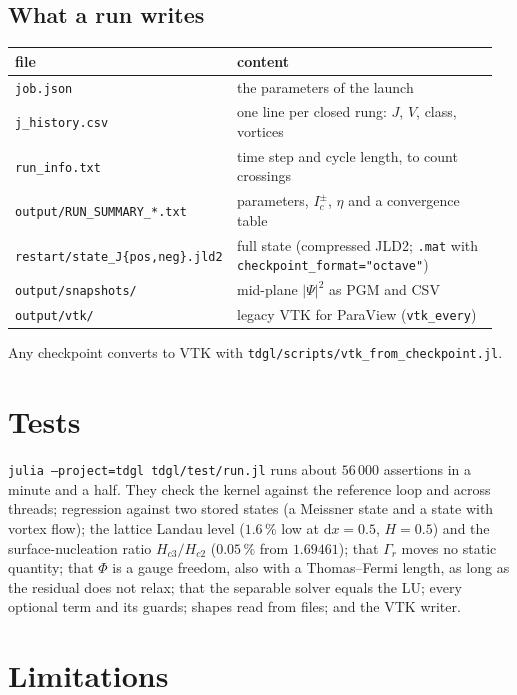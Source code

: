 \documentclass[11pt,a4paper]{article}
\newcommand{\Hc}[1]{H_{c#1}}
\newcommand{\code}[1]{\texttt{#1}}
\begin{document}
\subsection{What a run writes}
\begin{center}
\begin{tabular}{@{}p{0.42\linewidth}p{0.54\linewidth}@{}}
\toprule
file & content \\
\midrule
\code{job.json} & the parameters of the launch \\
\code{j\_history.csv} & one line per closed rung: $J$, $V$, class, vortices \\
\code{run\_info.txt} & time step and cycle length, to count crossings \\
\code{output/RUN\_SUMMARY\_*.txt} & parameters, $I_c^\pm$, $\eta$ and a convergence table \\
\code{restart/state\_J\{pos,neg\}.jld2} & full state (compressed JLD2; \code{.mat} with \code{checkpoint\_format="octave"}) \\
\code{output/snapshots/} & mid-plane $|\Psi|^2$ as PGM and CSV \\
\code{output/vtk/} & legacy VTK for ParaView (\code{vtk\_every}) \\
\bottomrule
\end{tabular}
\end{center}
Any checkpoint converts to VTK with \code{tdgl/scripts/vtk\_from\_checkpoint.jl}.

\section{Tests}

\code{julia --project=tdgl tdgl/test/run.jl} runs about $56\,000$
assertions in a minute and a half. They check the kernel against the
reference loop and across threads; regression against two stored states
(a Meissner state and a state with vortex flow);
the lattice Landau level ($1.6\,\%$ low at $\mathrm dx=0.5$, $H=0.5$) and
the surface-nucleation ratio $\Hc3/\Hc2$ ($0.05\,\%$ from $1.69461$);
that $\Gamma_r$ moves no static quantity; that $\Phi$ is a gauge freedom,
also with a Thomas--Fermi length, as long as the residual does not relax;
that the separable solver equals the LU; every optional term and its guards;
shapes read from files; and the VTK writer.

\section{Limitations}
\end{document}

